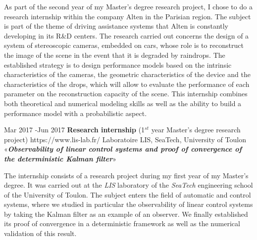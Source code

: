 \documentclass[10pt]{article} %
\begin{document}
{	As part of the second year of my Master's degree research project, I chose to do a research internship within the company Alten in the Parisian region. The subject is part of the theme of driving assistance systems that Alten is constantly developing in its R\&D centers. The research carried out concerns the design of a system of stereoscopic cameras, embedded on cars, whose role is to reconstruct the image of the scene in the event that it is degraded by raindrops. The established strategy is to design performance models based on the intrinsic characteristics of the cameras, the geometric characteristics of the device and the characteristics of the drops, which will allow to evaluate the performance of each parameter on the reconstruction capacity of the scene. This internship combines both theoretical and numerical modeling skills as well as the ability to build a performance model with a probabilistic aspect.

}



\job
{Mar 2017 -}{Jun 2017}
{\textbf{Research internship} (1$^{st}$ year Master's degree research project)}
{https://www.lis-lab.fr/}
{Laboratoire LIS, SeaTech, University of Toulon}
{«\textbf{\textit{Observability of linear control systems and proof of convergence of the deterministic Kalman filter}}»}


{	The internship consists of a research project during my first year of my Master's degree. It was carried out at the \textit{LIS} laboratory of the \textit{SeaTech} engineering school of the University of Toulon. The subject enters the field of automatic and control systems, where we studied in particular the observability of linear control systems by taking the Kalman filter as an example of an observer. We finally established its proof of convergence in a deterministic framework as well as the numerical validation of this result.
	
}
\end{document}
